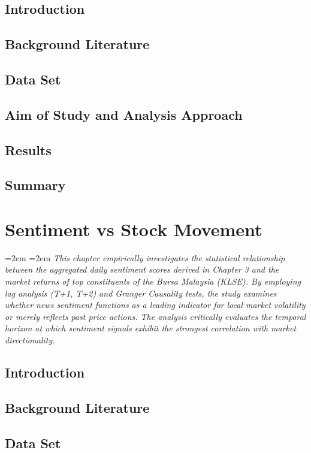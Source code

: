 \documentclass[singlespace]{ucetd}
\newcommand{\chapterabstract}[1]{%
  \par\vspace{1em}
  \begingroup
  \leftskip=2em
  \rightskip=2em
  \noindent\itshape
  #1
  \par
  \endgroup
  \vspace{1.5em}
}
\begin{document}
\section{Introduction}
\section{Background Literature}
\section{Data Set}
\section{Aim of Study and Analysis Approach}
\section{Results}
\section{Summary}




\chapter{Sentiment vs Stock Movement}

\chapterabstract{This chapter empirically investigates the statistical relationship between the aggregated daily sentiment scores derived in Chapter 3 and the market returns of top constituents of the Bursa Malaysia (KLSE). By employing lag analysis (T+1, T+2) and Granger Causality tests, the study examines whether news sentiment functions as a leading indicator for local market volatility or merely reflects past price actions. The analysis critically evaluates the temporal horizon at which sentiment signals exhibit the strongest correlation with market directionality.}

\section{Introduction}
\section{Background Literature}
\section{Data Set}
\end{document}
